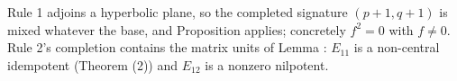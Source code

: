 Rule 1 adjoins a hyperbolic plane, so the completed signature $(p{+}1, q{+}1)$ is mixed whatever the base, and Proposition  applies; concretely $f^2 = 0$ with $f \neq 0$. Rule 2's completion contains the matrix units of Lemma : $E_{11}$ is a non-central idempotent (Theorem (2)) and $E_{12}$ is a nonzero nilpotent.

